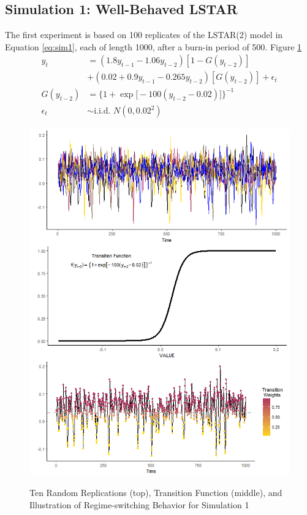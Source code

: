 \vskip 3mm

\subsection{Simulation 1: Well-Behaved LSTAR}

The first experiment is based on 100 replicates of the LSTAR(2) model in Equation \ref{eq:sim1}, each of length 1000, after a burn-in period of 500. Figure \ref{fig:sim1plots} 
\begin{equation}
	\begin{split}
		\label{eq:sim1}
		y_t&=(1.8y_{t-1}-1.06y_{t-2})[1-G(y_{t-2})]\\ 
		&+ (0.02+0.9y_{t-1}-0.265y_{t-2})[G(y_{t-2})]+\epsilon_t\\
		G(y_{t-2})&=\bigg\{1+\exp\big[-100(y_{t-2}-0.02)\big]\bigg\}^{-1}\\
		\epsilon_t &\sim \textrm{i.i.d. }  N(0,0.02^2)
	\end{split}
\end{equation}

\begin{figure}[ht!]
	\centering
	\caption{Ten Random Replications (top), Transition Function (middle), and Illustration of Regime-switching Behavior  for Simulation 1 }
	\includegraphics[scale=.7]{sim1plots}
	\label{fig:sim1plots}
\end{figure}

